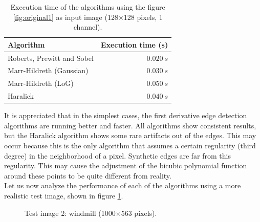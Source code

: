 \documentclass{ipol}
\numberwithin{equation}{section}
\numberwithin{table}{section}
\numberwithin{figure}{section}
\begin{document}
\begin{table}[t!]
	\begin{center}
	\begin{tabular}{| l | r |}
		\hline \rule{0pt}{3ex}
		\cellcolor[gray]{0.8} \textbf{Algorithm}	& \cellcolor[gray]{0.8} \textbf{Execution time (s)}	\\ \hline \rule{0pt}{3ex}
		Roberts, Prewitt and Sobel					& $0.020 \ s$										\\ \hline \rule{0pt}{3ex}
		Marr-Hildreth (Gaussian)					& $0.030 \ s$										\\ \hline \rule{0pt}{3ex}
		Marr-Hildreth (LoG)							& $0.050 \ s$										\\ \hline \rule{0pt}{3ex}
		Haralick									& $0.040 \ s$										\\
		\hline
	\end{tabular}
	\end{center}
	\caption{Execution time of the algorithms using the figure \ref{fig:original1} as input image (128$\times$128 pixels, 1 channel).}
	\label{exectime1}
\end{table}
\vspace{0.5cm}

It is appreciated that in the simplest cases, the first derivative edge detection algorithms are running better and faster. All algorithms show consistent results, but the Haralick algorithm shows some rare artifacts out of the edges. This may occur because this is the only algorithm that assumes a certain regularity (third degree) in the neighborhood of a pixel. Synthetic edges are far from this regularity. This may cause the adjustment of the bicubic polynomial function around these points to be quite different from reality. \\

Let us now analyze the performance of each of the algorithms using a more realistic test image, shown in figure \ref{fig:original2}. \\

\begin{figure}[t!]
	\centering
	\quad
	\caption{Test image 2: windmill (1000$\times$563 pixels).}
	\label{fig:original2}
\end{figure}
\end{document}
